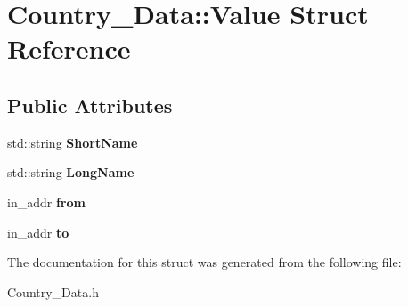 \hypertarget{struct_country___data_1_1_value}{}\section{Country\+\_\+\+Data\+:\+:Value Struct Reference}
\label{struct_country___data_1_1_value}
\subsection*{Public Attributes}
\begin{DoxyCompactItemize}
\item 
\hypertarget{struct_country___data_1_1_value_aca0781b09da67f07ec817432b0be82fc}{}std\+::string {\bfseries Short\+Name}\label{struct_country___data_1_1_value_aca0781b09da67f07ec817432b0be82fc}

\item 
\hypertarget{struct_country___data_1_1_value_a39b3463caef9a86b5848ef18c6df837d}{}std\+::string {\bfseries Long\+Name}\label{struct_country___data_1_1_value_a39b3463caef9a86b5848ef18c6df837d}

\item 
\hypertarget{struct_country___data_1_1_value_a10fc8d2a53fd927c8ca62ba5058b38ab}{}in\+\_\+addr {\bfseries from}\label{struct_country___data_1_1_value_a10fc8d2a53fd927c8ca62ba5058b38ab}

\item 
\hypertarget{struct_country___data_1_1_value_a2e6b769c0e288a62ebc8bf0ae9d9e23c}{}in\+\_\+addr {\bfseries to}\label{struct_country___data_1_1_value_a2e6b769c0e288a62ebc8bf0ae9d9e23c}

\end{DoxyCompactItemize}


The documentation for this struct was generated from the following file\+:\begin{DoxyCompactItemize}
\item 
Country\+\_\+\+Data.\+h\end{DoxyCompactItemize}
